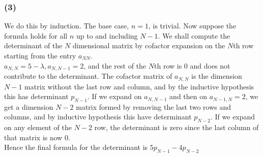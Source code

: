 \documentclass{article}
\begin{document}
\subsubsection{(3)} We do this by induction. The base case, $n=1$, is trivial. Now suppose the formula holds for all $n$ up to and including $N-1$. We shall compute the determinant of the $N$ dimensional matrix by cofactor expansion on the $N$th row starting from the entry $a_{NN}$. 
\\$a_{N,N}=5-\lambda,a_{N,N-1}=2$, and the rest of the $N$th row is 0 and does not contribute to the determinant. The cofactor matrix of $a_{N,N}$ is the dimension $N-1$ matrix without the last row and column, and by the inductive hypothesis this has determinant $p_{N-1}$. If we expand on $a_{N,N-1}$ and then on $a_{N-1,N}=2$, we get a dimension $N-2$ matrix formed by removing the last two rows and columns, and by inductive hypothesis this have determinant $p_{N-2}$. If we expand on any element of the $N-2$ row, the determinant is zero since the last column of that matrix is now 0.
\\Hence the final formula for the determinant is $5p_{N-1}-4p_{N-2}$
\end{document}
